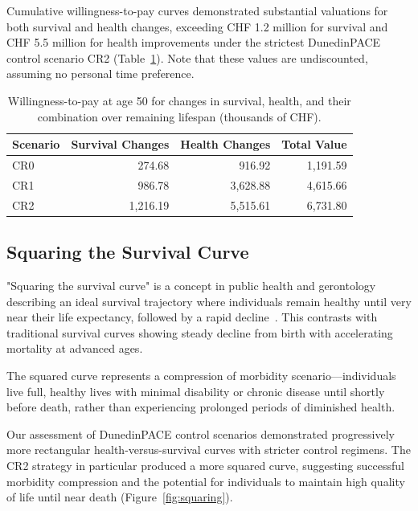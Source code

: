 Cumulative willingness-to-pay curves demonstrated substantial valuations for both survival and health changes, exceeding CHF 1.2 million for survival and CHF 5.5 million for health improvements under the strictest DunedinPACE control scenario CR2 (Table~\ref{tab:wtp}). Note that these values are undiscounted, assuming no personal time preference.

\begin{table}[h]
\centering
\small
\setlength{\tabcolsep}{4pt}
\begin{tabular}{lrrr}
\toprule
\textbf{Scenario} & \textbf{Survival Changes} & \textbf{Health Changes} & \textbf{Total Value} \\
\midrule
CR0 & 274.68 & 916.92 & 1,191.59 \\
CR1 & 986.78 & 3,628.88 & 4,615.66 \\
CR2 & 1,216.19 & 5,515.61 & 6,731.80 \\
\bottomrule
\end{tabular}
\caption{Willingness-to-pay at age 50 for changes in survival, health, and their combination over remaining lifespan (thousands of CHF).}
\label{tab:wtp}
\end{table}

\subsection{Squaring the Survival Curve}

"Squaring the survival curve" is a concept in public health and gerontology describing an ideal survival trajectory where individuals remain healthy until very near their life expectancy, followed by a rapid decline~\cite{Caselli2021}. This contrasts with traditional survival curves showing steady decline from birth with accelerating mortality at advanced ages.

The squared curve represents a compression of morbidity scenario—individuals live full, healthy lives with minimal disability or chronic disease until shortly before death, rather than experiencing prolonged periods of diminished health.

Our assessment of DunedinPACE control scenarios demonstrated progressively more rectangular health-versus-survival curves with stricter control regimens. The CR2 strategy in particular produced a more squared curve, suggesting successful morbidity compression and the potential for individuals to maintain high quality of life until near death (Figure~\ref{fig:squaring}).


